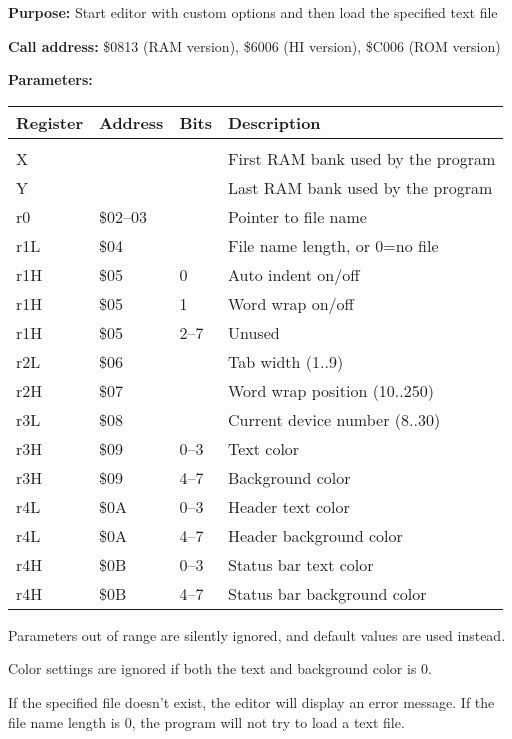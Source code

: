 \documentclass{article}
\begin{document}
        \textbf{Purpose:} Start editor with custom options and then load the specified text file

        \textbf{Call address:} \$0813 (RAM version), \$6006 (HI version), \$C006 (ROM version)

        \textbf{Parameters:}

        \begin{longtable}[l]{l l l l}
	        \textbf{Register} & \textbf{Address} & \textbf{Bits} & \textbf{Description} \\
	        \hline \\
            X   &          &      & First RAM bank used by the program \\
            Y   &          &      & Last RAM bank used by the program \\
            r0  & \$02--03 &      & Pointer to file name \\
            r1L & \$04     &      & File name length, or 0=no file \\
            r1H & \$05     & 0    & Auto indent on/off \\
            r1H & \$05     & 1    & Word wrap on/off \\
            r1H & \$05     & 2--7 & Unused \\
            r2L & \$06     &      & Tab width (1..9) \\
            r2H & \$07     &      & Word wrap position (10..250) \\
            r3L & \$08     &      & Current device number (8..30) \\
            r3H & \$09     & 0--3 & Text color \\
            r3H & \$09     & 4--7 & Background color \\
            r4L & \$0A     & 0--3 & Header text color \\
            r4L & \$0A     & 4--7 & Header background color \\
            r4H & \$0B     & 0--3 & Status bar text color \\
            r4H & \$0B     & 4--7 & Status bar background color \\
        \end{longtable}

        Parameters out of range are silently ignored, and default
        values are used instead.

        Color settings are ignored if both the text and background color is 0.

        If the specified file doesn't exist, the editor will display an
        error message. If the file name length is 0, the program will not try
        to load a text file.
\end{document}
